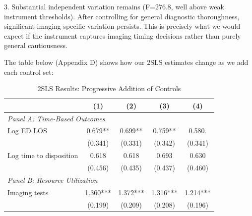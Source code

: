 \documentclass[11pt]{article}
\newcommand{\1}{\hbox{\rm 1\kern-.35em 1}}
\begin{document}
3. Substantial independent variation remains (F=276.8, well above weak instrument thresholds). After controlling for general diagnostic thoroughness, significant imaging-specific variation persists. This is precisely what we would expect if the instrument captures imaging timing decisions rather than purely general cautiousness.

The table below (Appendix D) shows how our 2SLS estimates change as we add each control set:

\begin{table}[H]
\centering
\caption*{2SLS Results: Progressive Addition of Controls}
\begin{threeparttable}
\small
\begin{tabular}{lcccc}
\toprule
& (1) & (2) & (3) & (4) \\
\midrule
\multicolumn{4}{l}{\textit{Panel A: Time-Based Outcomes}} \\[0.5em]
Log ED LOS & 0.679** & 0.699** & 0.759**  & 0.580. \\
& (0.341) & (0.331) & (0.342)  & (0.341) \\[0.5em]
Log time to disposition & 0.618 & 0.618 & 0.693 & 0.630 \\
& (0.456) & (0.435) & (0.437)  & (0.460) \\[0.5em]

\multicolumn{4}{l}{\textit{Panel B: Resource Utilization}} \\[0.5em]
Imaging tests & 1.360*** & 1.372*** & 1.316***  & 1.214*** \\
& (0.199) & (0.209) & (0.208) & (0.196) \\[0.5em]


\end{tabular}
\end{threeparttable}
\end{table}
\end{document}
